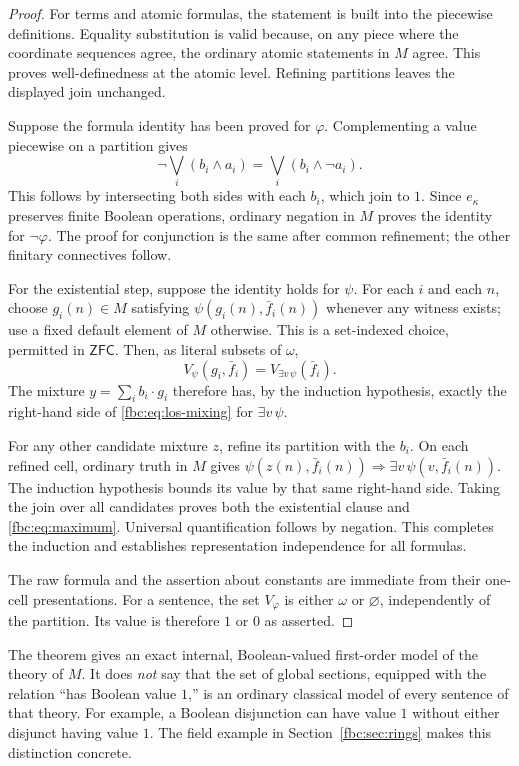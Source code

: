 \documentclass[11pt,letterpaper]{article}
\theoremstyle{definition}
\theoremstyle{remark}
\newcommand{\om}{\omega}
\newcommand{\ZFC}{\mathsf{ZFC}}
\begin{document}
\begin{proof}
For terms and atomic formulas, the statement is built into the
piecewise definitions. Equality substitution is valid because, on
any piece where the coordinate sequences agree, the ordinary
atomic statements in $M$ agree. This proves well-definedness at the
atomic level. Refining partitions leaves the displayed join unchanged.

Suppose the formula identity has been proved for $\varphi$.
Complementing a value piecewise on a partition gives
\[
 \neg\bigvee_i(b_i\wedge a_i)
       =\bigvee_i(b_i\wedge\neg a_i).
\]
This follows by intersecting both sides with each $b_i$, which join
to $1$. Since $e_\kappa$ preserves finite Boolean operations,
ordinary negation in $M$ proves the identity for $\neg\varphi$.
The proof for conjunction is the same after common refinement;
the other finitary connectives follow.

For the existential step, suppose the identity holds for $\psi$.
For each $i$ and each $n$, choose $g_i(n)\in M$ satisfying
$\psi(g_i(n),\bar f_i(n))$ whenever any witness exists; use a fixed
default element of $M$ otherwise. This is a set-indexed choice,
permitted in $\ZFC$. Then, as literal subsets of $\om$,
\[
 V_\psi(g_i,\bar f_i)=V_{\exists v\,\psi}(\bar f_i).
\]
The mixture $y=\sum_i b_i\cdot g_i$ therefore has, by the induction
hypothesis, exactly the right-hand side of
\eqref{fbc:eq:los-mixing} for $\exists v\,\psi$.

For any other candidate mixture $z$, refine its partition with the
$b_i$. On each refined cell, ordinary truth in $M$ gives
$\psi(z(n),\bar f_i(n))\Rightarrow\exists v\,\psi(v,\bar f_i(n))$.
The induction hypothesis bounds its value by that same right-hand
side. Taking the join over all candidates proves both the
existential clause and \eqref{fbc:eq:maximum}. Universal quantification
follows by negation. This completes the induction and establishes
representation independence for all formulas.

The raw formula and the assertion about constants are immediate from
their one-cell presentations. For a sentence, the set $V_\varphi$ is
either $\om$ or $\varnothing$, independently of the partition. Its value
is therefore $1$ or $0$ as asserted.
\end{proof}

The theorem gives an exact internal, Boolean-valued first-order
model of the theory of $M$. It does \emph{not} say that the set of
global sections, equipped with the relation ``has Boolean value
$1$,'' is an ordinary classical model of every sentence of that
theory. For example, a Boolean disjunction can have value $1$
without either disjunct having value $1$. The field example in
Section~\ref{fbc:sec:rings} makes this distinction concrete.
\end{document}
